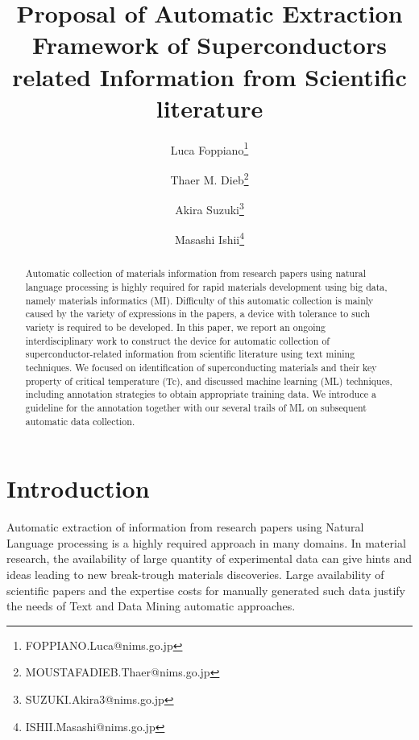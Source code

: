 \documentclass{article}
\title{Proposal of Automatic Extraction Framework of Superconductors related Information from Scientific literature}
\author[1]{Luca Foppiano\thanks{FOPPIANO.Luca@nims.go.jp}}
\author[1]{Thaer M. Dieb\thanks{MOUSTAFADIEB.Thaer@nims.go.jp}}
\author[1]{Akira Suzuki\thanks{SUZUKI.Akira3@nims.go.jp}}
\author[1]{Masashi Ishii\thanks{ISHII.Masashi@nims.go.jp}}
\affil[1]{Research and Services Division of Materials Data and Integrated System (MaDIS), National Institute for Materials Science (NIMS), 1-2-1 Sengen, Tsukuba, Ibaraki 305-0047, Japan}
\begin{document}
\maketitle

\begin{abstract}
Automatic collection of materials information from research papers using natural language processing is highly required for rapid materials development using big data, namely materials informatics (MI). Difficulty of this automatic collection is mainly caused by the variety of expressions in the papers, a device with tolerance to such variety is required to be developed. 
In this paper, we report an ongoing interdisciplinary work to construct the device for automatic collection of superconductor-related information from scientific literature using text mining techniques. We focused on identification of superconducting materials and their key property of critical temperature (Tc), and discussed machine learning (ML) techniques, including annotation strategies to obtain appropriate training data. We introduce a guideline for the annotation together with our several trails of ML on subsequent automatic data collection.
\end{abstract}

\pagebreak

\tableofcontents

\pagebreak



\section{Introduction}

Automatic extraction of information from research papers using Natural Language processing is a highly required approach in many domains. In material research, the availability of large quantity of experimental data can give hints and ideas leading to new break-trough materials discoveries. Large availability of scientific papers and the expertise costs for manually generated such data justify the needs of Text and Data Mining automatic approaches.
\end{document}
